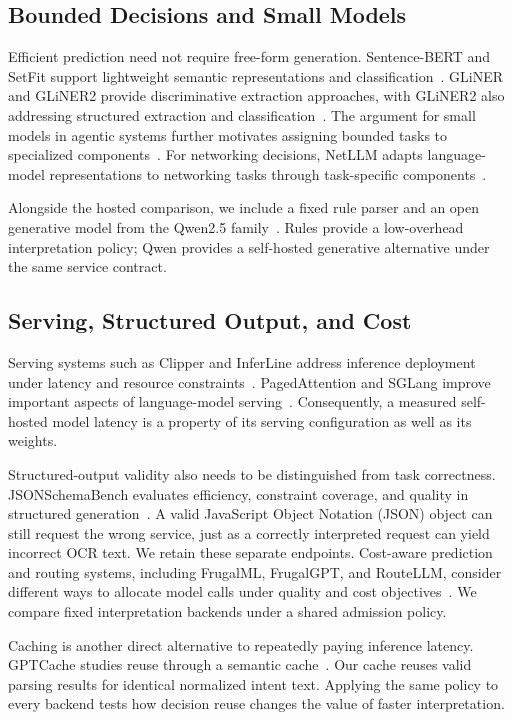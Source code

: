 \subsection{Bounded Decisions and Small Models}
Efficient prediction need not require free-form generation. Sentence-BERT
and SetFit support lightweight semantic representations and
classification~\cite{reimers2019sentencebert,tunstall2022efficient}.
GLiNER and GLiNER2 provide discriminative extraction approaches, with GLiNER2
also addressing structured extraction and classification~\cite{zaratiana2024gliner,zaratiana2025gliner2}.
The argument for small models in agentic systems further motivates assigning
bounded tasks to specialized components~\cite{belcak2025small}.
For networking decisions, NetLLM adapts language-model representations to
networking tasks through task-specific components~\cite{wu2024netllm}.

Alongside the hosted comparison, we include a fixed rule parser and an open
generative model from the Qwen2.5 family~\cite{qwen2024qwen25}. Rules provide
a low-overhead interpretation policy; Qwen provides a self-hosted generative
alternative under the same service contract.

\subsection{Serving, Structured Output, and Cost}
Serving systems such as Clipper and InferLine address inference deployment
under latency and resource constraints~\cite{crankshaw2016clipper,crankshaw2020inferline}.
PagedAttention and SGLang improve important aspects of language-model
serving~\cite{kwon2023efficient,zheng2023sglang}. Consequently, a measured
self-hosted model latency is a property of its serving configuration as well
as its weights.

Structured-output validity also needs to be distinguished from task
correctness. JSONSchemaBench evaluates efficiency, constraint coverage, and
quality in structured generation~\cite{geng2025jsonschemabench}. A valid JavaScript Object Notation (JSON)
object can still request the wrong service, just as a correctly interpreted
request can yield incorrect OCR text. We retain these separate endpoints.
Cost-aware prediction and routing systems, including FrugalML, FrugalGPT, and
RouteLLM, consider different ways to allocate model calls under quality and
cost objectives~\cite{chen2020frugalml,chen2023frugalgptb,ong2024routellma}.
We compare fixed interpretation backends under a shared admission policy.

Caching is another direct alternative to repeatedly paying inference
latency. GPTCache studies reuse through a semantic cache~\cite{bang2023gptcache}.
Our cache reuses valid parsing results for identical normalized intent text.
Applying the same policy to every backend tests how decision reuse changes
the value of faster interpretation.
